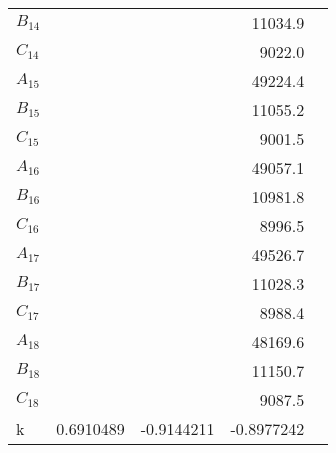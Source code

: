 \begin{table}
\begin{tabular}{lrrrr}
$B_{14   }$ &                 &                 &         11034.9 \\
$C_{14   }$ &                 &                 &          9022.0 \\
$A_{15   }$ &                 &                 &         49224.4 \\
$B_{15   }$ &                 &                 &         11055.2 \\
$C_{15   }$ &                 &                 &          9001.5 \\
$A_{16   }$ &                 &                 &         49057.1 \\
$B_{16   }$ &                 &                 &         10981.8 \\
$C_{16   }$ &                 &                 &          8996.5 \\
$A_{17   }$ &                 &                 &         49526.7 \\
$B_{17   }$ &                 &                 &         11028.3 \\
$C_{17   }$ &                 &                 &          8988.4 \\
$A_{18   }$ &                 &                 &         48169.6 \\
$B_{18   }$ &                 &                 &         11150.7 \\
$C_{18   }$ &                 &                 &          9087.5 \\
k      &       0.6910489 &      -0.9144211 &      -0.8977242 \\
\end{tabular}
\end{table}
